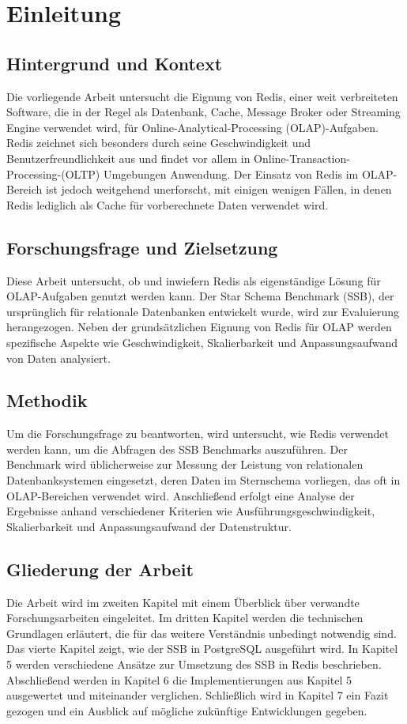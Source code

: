 \chapter{Einleitung}

\section{Hintergrund und Kontext}
Die vorliegende Arbeit untersucht die Eignung von Redis, einer weit verbreiteten Software, die in der Regel als Datenbank, Cache, Message Broker oder Streaming Engine verwendet wird, für Online-Analytical-Processing (OLAP)-Aufgaben. Redis zeichnet sich besonders durch seine Geschwindigkeit und Benutzerfreundlichkeit aus und findet vor allem in Online-Transaction-Processing-(OLTP) Umgebungen Anwendung. Der Einsatz von Redis im OLAP-Bereich ist jedoch weitgehend unerforscht, mit einigen wenigen Fällen, in denen Redis lediglich als Cache für vorberechnete Daten verwendet wird.

\section{Forschungsfrage und Zielsetzung}
Diese Arbeit untersucht, ob und inwiefern Redis als eigenständige Lösung für OLAP-Aufgaben genutzt werden kann. Der Star Schema Benchmark (SSB), der ursprünglich für relationale Datenbanken entwickelt wurde, wird zur Evaluierung herangezogen. Neben der grundsätzlichen Eignung von Redis für OLAP werden spezifische Aspekte wie Geschwindigkeit, Skalierbarkeit und Anpassungsaufwand von Daten analysiert.

\section{Methodik}
Um die Forschungsfrage zu beantworten, wird untersucht, wie Redis verwendet werden kann, um die Abfragen des SSB Benchmarks auszuführen. Der Benchmark wird üblicherweise zur Messung der Leistung von relationalen Datenbanksystemen eingesetzt, deren Daten im Sternschema vorliegen, das oft in OLAP-Bereichen verwendet wird.
Anschließend erfolgt eine Analyse der Ergebnisse anhand verschiedener Kriterien wie Ausführungsgeschwindigkeit, Skalierbarkeit und Anpassungsaufwand der Datenstruktur.


\section{Gliederung der Arbeit}
Die Arbeit wird im zweiten Kapitel mit einem Überblick über verwandte Forschungsarbeiten eingeleitet.
Im dritten Kapitel werden die technischen Grundlagen erläutert, die für das weitere Verständnis unbedingt notwendig sind.
Das vierte Kapitel zeigt, wie der \acf{SSB} in PostgreSQL ausgeführt wird.
In Kapitel 5 werden verschiedene Ansätze zur Umsetzung des \ac{SSB} in Redis beschrieben.
Abschließend werden in Kapitel 6 die Implementierungen aus Kapitel 5 ausgewertet und miteinander verglichen.
Schließlich wird in Kapitel 7 ein Fazit gezogen und ein Ausblick auf mögliche zukünftige Entwicklungen gegeben.

 